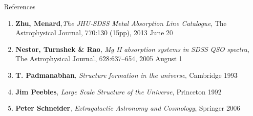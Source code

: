 \documentclass{beamer}
\begin{document}
		\begin{frame}{References}
			\begin{enumerate}
				\item \textbf{Zhu, Menard},\textit{The JHU-SDSS Metal Absorption Line Catalogue}, The Astrophysical Journal, 770:130 (15pp), 2013 June 20
				\item \textbf{Nestor, Turnshek \& Rao}, \textit{Mg II absorption systems in SDSS QSO spectra}, The Astrophysical Journal, 628:637–654, 2005 August 1
				\item \textbf{T. Padmanabhan}, \textit{Structure formation in the universe}, Cambridge 1993
				\item \textbf{Jim Peebles}, \textit{Large Scale Structure of the Universe}, Princeton 1992
				\item \textbf{Peter Schneider}, \textit{Extragalactic Astronomy and Cosmology}, Springer 2006
			\end{enumerate}
		\end{frame}
\end{document}
